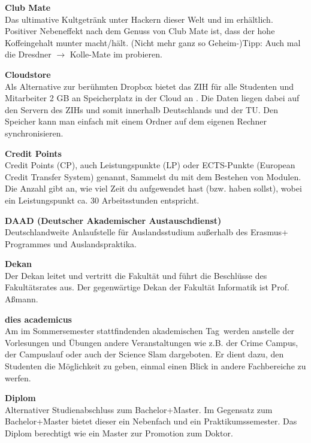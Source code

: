 \begin{multicols}{2}
\textbf{Club Mate} \\
Das ultimative Kultgetränk unter Hackern dieser Welt und im \ascii{} erhältlich.
Positiver Nebeneffekt nach dem Genuss von Club Mate ist, dass der hohe Koffeingehalt munter macht/hält.
(Nicht mehr ganz so Geheim-)Tipp:
Auch mal die Dresdner $\rightarrow$ Kolle-Mate im \ascii{} probieren. 

\textbf{Cloudstore} \\
Als Alternative zur berühmten Dropbox bietet das ZIH für alle Studenten und Mitarbeiter 2 GB an Speicherplatz in der Cloud an .
Die Daten liegen dabei auf den Servern des ZIHs und somit innerhalb Deutschlands und der TU. 
Den Speicher kann man einfach mit einem Ordner auf dem eigenen Rechner synchronisieren.



\textbf{Credit Points} \\
Credit Points (CP), auch Leistungspunkte (LP) oder ECTS-Punkte (European Credit Transfer System) genannt, Sammelst du mit dem Bestehen von Modulen.
Die Anzahl gibt an, wie viel Zeit du aufgewendet hast (bzw. haben sollst), wobei ein Leistungspunkt ca. 30 Arbeitsstunden entspricht.

\textbf{DAAD (Deutscher Akademischer Austauschdienst)} \\
Deutschlandweite Anlaufstelle für Auslandsstudium außerhalb des Erasmus+ Programmes und Auslands\-praktika.

\textbf{Dekan} \\
Der Dekan leitet und vertritt die Fakultät und führt die Beschlüsse des Fakultätsrates aus.
Der gegenwärtige Dekan der Fakultät Informatik ist Prof. Aßmann.

\textbf{dies academicus} \\
Am im Sommersemester stattfindenden \glqq akademischen Tag\grqq\ werden anstelle der Vorlesungen und Übungen andere Veranstaltungen wie z.B. der Crime Campus, der Campuslauf oder auch der Science Slam dargeboten.
Er dient dazu, den Studenten die Möglichkeit zu geben, einmal einen Blick in andere Fachbereiche zu werfen. 

\textbf{Diplom} \\
Alternativer Studienabschluss zum Bachelor+Master.
Im Gegensatz zum Bachelor+Master bietet dieser ein Nebenfach und ein Praktikumssemester.
Das Diplom berechtigt wie ein Master zur Promotion zum Doktor.


\end{multicols}
